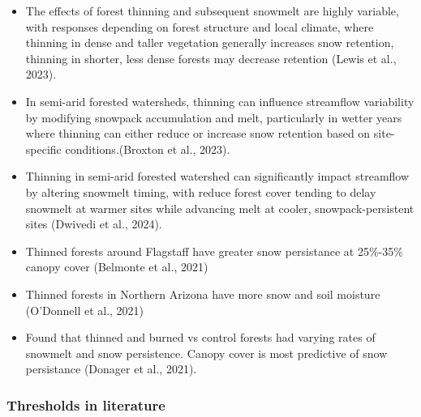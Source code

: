 \documentclass[
]{agujournal2019}
\begin{document}
\begin{itemize}
\item
  The effects of forest thinning and subsequent snowmelt are highly
  variable, with responses depending on forest structure and local
  climate, where thinning in dense and taller vegetation generally
  increases snow retention, thinning in shorter, less dense forests may
  decrease retention (Lewis et al., 2023).
\item
  In semi-arid forested watersheds, thinning can influence streamflow
  variability by modifying snowpack accumulation and melt, particularly
  in wetter years where thinning can either reduce or increase snow
  retention based on site-specific conditions.(Broxton et al., 2023).
\item
  Thinning in semi-arid forested watershed can significantly impact
  streamflow by altering snowmelt timing, with reduce forest cover
  tending to delay snowmelt at warmer sites while advancing melt at
  cooler, snowpack-persistent sites (Dwivedi et al., 2024).
\item
  Thinned forests around Flagstaff have greater snow persistance at
  25\%-35\% canopy cover (Belmonte et al., 2021)
\item
  Thinned forests in Northern Arizona have more snow and soil moisture
  (O'Donnell et al., 2021)
\item
  Found that thinned and burned vs control forests had varying rates of
  snowmelt and snow persistence. Canopy cover is most predictive of snow
  persistance (Donager et al., 2021).
\end{itemize}

\subsubsection{Thresholds in literature}\label{thresholds-in-literature}
\end{document}
